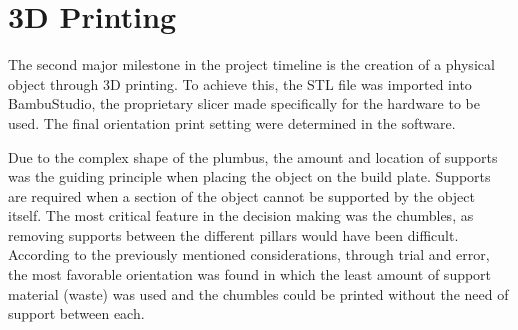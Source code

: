 \documentclass[12pt,a4paper]{article}
\begin{document}
\section{3D Printing}

The second major milestone in the project timeline is the creation of a physical
object through 3D printing. To achieve this, the STL file was imported into
BambuStudio, the proprietary slicer made specifically for the hardware to be
used. The final orientation print setting were determined in the software.

Due to the complex shape of the plumbus, the amount and location of supports was
the guiding principle when placing the object on the build plate. Supports are
required when a section of the object cannot be supported by the object itself.
The most critical feature in the decision making was the chumbles, as removing
supports between the different pillars would have been difficult.
According to the previously mentioned considerations, through trial and error,
the most favorable orientation was found in which the least amount of support
material (waste) was used and the chumbles could be printed without the need of
support between each.
\end{document}
